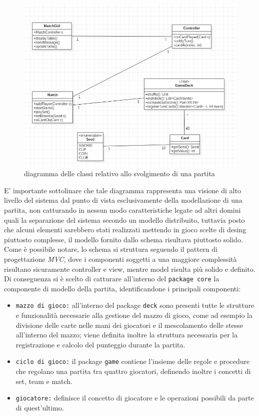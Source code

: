 \begin{figure}[htbp]
  \includegraphics[width=\textwidth,height=\textheight,keepaspectratio]{initialArchitecture}
   \caption{diagramma delle classi relativo allo svolgimento di una partita}
\end{figure}

 E' importante sottolinare che tale diagramma rappresenta una visione di alto livello del sistema dal punto di vista esclusivamente della modellazione di una partita, non catturando in nessun modo caratteristiche legate ad altri domini quali la separazione del sistema secondo un modello distribuito, tuttavia posto che alcuni elementi sarebbero stati realizzati mettendo in gioco scelte di desing piuttosto complesse, il modello fornito dallo schema risultava piuttosto solido.
 Come è possibile notare, lo schema si struttura seguendo il pattern di progettazione \textit{MVC}, dove i componenti soggetti a una maggiore complessità risultano sicuramente controller e view, mentre model risulta più solido e definito.
 Di conseguenza si è scelto di catturare all'interno del \texttt{package core} la componente di modello della partita, identificandone i principali componenti:

\begin{itemize}
  \item{\texttt{mazzo di gioco:\/}} all'interno del package \texttt{deck} sono presenti tutte le strutture e funzionalità necessarie alla gestione del mazzo di gioco, come ad esempio la divisione delle carte nelle mani dei giocatori e il mescolamento delle stesse all'interno del mazzo; viene definita inoltre la struttura necessaria per la registrazione e calcolo del punteggio durante la partita.


  \item{\texttt{ciclo di gioco:\/}} il package \texttt{game} contiene l'insieme delle regole e procedure che regolano una partita tra quattro giocatori, definendo inoltre i concetti di set, team e match.

  \item{\texttt{giocatore:\/}} definisce il concetto di giocatore e le operazioni possibili da parte di quest'ultimo.

\end{itemize}


